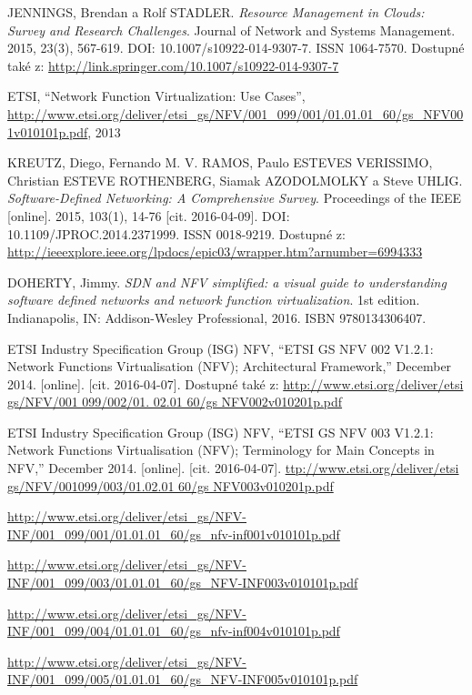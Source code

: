 \begin{thebibliography}{10}
JENNINGS, Brendan a Rolf STADLER. \emph{Resource Management in Clouds: Survey and Research Challenges}. Journal of Network and Systems Management. 2015, 23(3), 567-619. DOI: 10.1007/s10922-014-9307-7. ISSN 1064-7570. Dostupné také z: \url{http://link.springer.com/10.1007/s10922-014-9307-7}

ETSI, “Network Function Virtualization: Use Cases”, \url{http://www.etsi.org/deliver/etsi_gs/NFV/001_099/001/01.01.01_60/gs_NFV001v010101p.pdf}, 2013

KREUTZ, Diego, Fernando M. V. RAMOS, Paulo ESTEVES VERISSIMO, Christian ESTEVE ROTHENBERG, Siamak AZODOLMOLKY a Steve UHLIG. \emph{Software-Defined Networking: A Comprehensive Survey}. Proceedings of the IEEE [online]. 2015, 103(1), 14-76 [cit. 2016-04-09]. DOI: 10.1109/JPROC.2014.2371999. ISSN 0018-9219. Dostupné z: \url{http://ieeexplore.ieee.org/lpdocs/epic03/wrapper.htm?arnumber=6994333}

 DOHERTY, Jimmy. \emph{SDN and NFV simplified: a visual guide to understanding software defined networks and network function virtualization}. 1st edition. Indianapolis, IN: Addison-Wesley Professional, 2016. ISBN 9780134306407.

ETSI Industry Specification Group (ISG) NFV, “ETSI GS NFV 002 V1.2.1: Network Functions Virtualisation (NFV); Architectural Framework,” December 2014. [online]. [cit. 2016-04-07]. Dostupné také z: \url{http://www.etsi.org/deliver/etsi gs/NFV/001 099/002/01. 02.01 60/gs NFV002v010201p.pdf} 

ETSI Industry Specification Group (ISG) NFV, “ETSI GS NFV 003 V1.2.1: Network Functions Virtualisation (NFV); Terminology for Main Concepts in NFV,” December 2014. [online]. [cit. 2016-04-07]. \url{ttp://www.etsi.org/deliver/etsi gs/NFV/001099/003/01.02.01 60/gs NFV003v010201p.pdf}

\url{http://www.etsi.org/deliver/etsi_gs/NFV-INF/001_099/001/01.01.01_60/gs_nfv-inf001v010101p.pdf}

 \url{http://www.etsi.org/deliver/etsi_gs/NFV-INF/001_099/003/01.01.01_60/gs_NFV-INF003v010101p.pdf}

 \url{http://www.etsi.org/deliver/etsi_gs/NFV-INF/001_099/004/01.01.01_60/gs_nfv-inf004v010101p.pdf}

 \url{http://www.etsi.org/deliver/etsi_gs/NFV-INF/001_099/005/01.01.01_60/gs_NFV-INF005v010101p.pdf}


\end{thebibliography}
